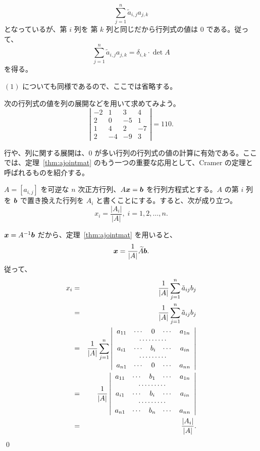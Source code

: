 $$\sum_{j = 1}^n\tilde{a}_{i,j} a_{j,k}$$
となっているが、第 $i$ 列を 第 $k$ 列と同じだから行列式の値は 0 である。従って、
$$\sum_{j = 1}^n\tilde{a}_{i,j} a_{j,k}= \delta_{i,k}\cdot\det A$$
を得る。

$(1)$ についても同様であるので、ここでは省略する。

\begin{eg}
次の行列式の値を列の展開などを用いて求めてみよう。
$$\left|\begin{array}{cccc}-2 & 1 & 3 & 4 \\ 2 & 0 & -5 & 1\\
1 & 4 & 2 & -7\\ 2 & -4 & -9 & 3\end{array}\right| = 110.$$
\end{eg}

\smallskip
行や、列に関する展開は、$0$ が多い行列の行列式の値の計算に有効である。ここでは、定理~\ref{thm:ajointmat} のもう一つの重要な応用として、Cramer の定理と呼ばれるものを紹介する。

\begin{thm} \label{thm:cramer}
$A = [a_{i,j}]$  を可逆な $n$ 次正方行列、$A\mbox{\boldmath $x$} = \mbox{\boldmath $b$}$ を行列方程式とする。$A$ の第 $i$ 列を $\mbox{\boldmath $b$}$ で置き換えた行列を $A_i$ と書くことにする。すると、次が成り立つ。
$$x_i = \frac{|A_i|}{|A|}, \;i = 1,2,\ldots, n.$$
\end{thm}
\proof
$\mbox{\boldmath $x$} = A^{-1}\mbox{\boldmath $b$}$ だから、定理~\ref{thm:ajointmat} を用いると、
$$\mbox{\boldmath $x$} = \frac{1}{|A|}\widetilde{A}\mbox{\boldmath $b$}.$$
従って、
\begin{eqnarray*}
x_i & = & \frac{1}{|A|}\sum_{j=1}^n\tilde{a}_{ij}b_j\\
& = & \frac{1}{|A|}\sum_{j=1}^n\tilde{a}_{ij}b_j\\
& = & \frac{1}{|A|}\sum_{j = 1}^n \left|\begin{array}{ccccc}
a_{11} & \cdots & 0 & \cdots & a_{1n}\\
\multicolumn{5}{c}{\cdots\cdots\cdots}\\
a_{i1} & \cdots & b_i & \cdots & a_{in}\\
\multicolumn{5}{c}{\cdots\cdots\cdots}\\
a_{n1} & \cdots & 0 & \cdots & a_{nn}
\end{array}\right|\\
& = & \frac{1}{|A|}\left|\begin{array}{ccccc}
a_{11} & \cdots & b_1 & \cdots & a_{1n}\\
\multicolumn{5}{c}{\cdots\cdots\cdots}\\
a_{i1} & \cdots & b_i & \cdots & a_{in}\\
\multicolumn{5}{c}{\cdots\cdots\cdots}\\
a_{n1} & \cdots & b_n & \cdots & a_{nn}
\end{array}\right|\\
& = & \frac{|A_i|}{|A|}.
\end{eqnarray*}
\qed

